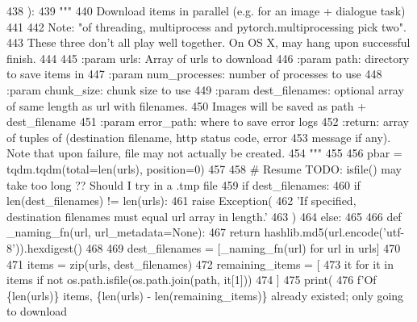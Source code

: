 \begin{DoxyCode}
438 ):
439     \textcolor{stringliteral}{"""}
440 \textcolor{stringliteral}{    Download items in parallel (e.g. for an image + dialogue task)}
441 \textcolor{stringliteral}{}
442 \textcolor{stringliteral}{    Note: "of threading, multiprocess and pytorch.multiprocessing pick two".}
443 \textcolor{stringliteral}{    These three don't all play well together. On OS X, may hang upon successful finish.}
444 \textcolor{stringliteral}{}
445 \textcolor{stringliteral}{    :param urls: Array of urls to download}
446 \textcolor{stringliteral}{    :param path: directory to save items in}
447 \textcolor{stringliteral}{    :param num\_processes: number of processes to use}
448 \textcolor{stringliteral}{    :param chunk\_size: chunk size to use}
449 \textcolor{stringliteral}{    :param dest\_filenames: optional array of same length as url with filenames.}
450 \textcolor{stringliteral}{     Images will be saved as path + dest\_filename}
451 \textcolor{stringliteral}{    :param error\_path: where to save error logs}
452 \textcolor{stringliteral}{    :return: array of tuples of (destination filename, http status code, error}
453 \textcolor{stringliteral}{    message if any). Note that upon failure, file may not actually be created.}
454 \textcolor{stringliteral}{    """}
455 
456     pbar = tqdm.tqdm(total=len(urls), position=0)
457 
458     \textcolor{comment}{# Resume TODO: isfile() may take too long ?? Should I try in a .tmp file}
459     \textcolor{keywordflow}{if} dest\_filenames:
460         \textcolor{keywordflow}{if} len(dest\_filenames) != len(urls):
461             \textcolor{keywordflow}{raise} Exception(
462                 \textcolor{stringliteral}{'If specified, destination filenames must equal url array in length.'}
463             )
464     \textcolor{keywordflow}{else}:
465 
466         \textcolor{keyword}{def }\_naming\_fn(url, url\_metadata=None):
467             \textcolor{keywordflow}{return} hashlib.md5(url.encode(\textcolor{stringliteral}{'utf-8'})).hexdigest()
468 
469         dest\_filenames = [\_naming\_fn(url) \textcolor{keywordflow}{for} url \textcolor{keywordflow}{in} urls]
470 
471     items = zip(urls, dest\_filenames)
472     remaining\_items = [
473         it \textcolor{keywordflow}{for} it \textcolor{keywordflow}{in} items \textcolor{keywordflow}{if} \textcolor{keywordflow}{not} os.path.isfile(os.path.join(path, it[1]))
474     ]
475     print(
476         f\textcolor{stringliteral}{'Of \{len(urls)\} items, \{len(urls) - len(remaining\_items)\} already existed; only going to download
}
\end{DoxyCode}
